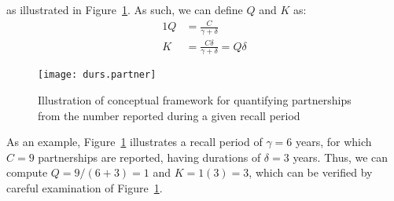 as illustrated in Figure~\ref{fig:durs.partner}.
As such, we can define $Q$ and $K$ as:
\begin{alignat}{1}
  Q &= \frac{C}{\gamma+\delta} \label{eq:C2Q.app}\\
  K &= \frac{C\delta}{\gamma+\delta} = Q\delta \label{eq:C2K.app}
\end{alignat}
\begin{figure}
  \centering
  \texttt{[image: durs.partner]}
  \caption{Illustration of conceptual framework for quantifying partnerships
    from the number reported during a given recall period}
  \label{fig:durs.partner}
\end{figure}
\par
As an example, Figure~\ref{fig:durs.partner} illustrates
a recall period of $\gamma = 6$ years,
for which $C = 9$ partnerships are reported,
having durations of $\delta = 3$ years.
Thus, we can compute $Q = 9/(6+3) = 1$ and $K = 1(3) = 3$,
which can be verified by careful examination of Figure~\ref{fig:durs.partner}.
